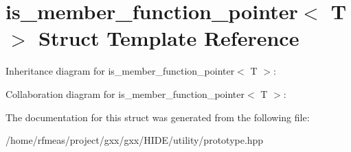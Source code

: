 \hypertarget{structis__member__function__pointer}{}\section{is\+\_\+member\+\_\+function\+\_\+pointer$<$ T $>$ Struct Template Reference}
\label{structis__member__function__pointer}


Inheritance diagram for is\+\_\+member\+\_\+function\+\_\+pointer$<$ T $>$\+:


Collaboration diagram for is\+\_\+member\+\_\+function\+\_\+pointer$<$ T $>$\+:


The documentation for this struct was generated from the following file\+:\begin{DoxyCompactItemize}
\item 
/home/rfmeas/project/gxx/gxx/\+H\+I\+D\+E/utility/prototype.\+hpp\end{DoxyCompactItemize}
